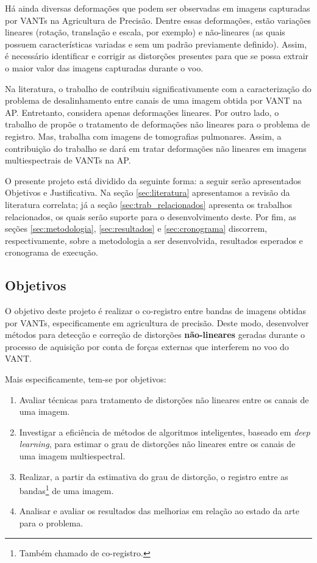 \documentclass[12pt]{article}
\begin{document}
Há ainda diversas deformações que podem ser observadas em imagens capturadas por VANTs na Agricultura de Precisão. Dentre essas deformações, estão variações lineares (rotação, translação e escala, por exemplo) e não-lineares (as quais possuem características variadas e sem um padrão previamente definido). Assim, é necessário identificar e corrigir as distorções presentes para que se possa extrair o maior valor das imagens capturadas durante o voo.

Na literatura, o trabalho de \cite{dias2020uav} contribuiu significativamente com a caracterização do problema de desalinhamento entre canais de uma imagem obtida por VANT na AP. Entretanto, \cite{dias2020uav} considera apenas deformações lineares. Por outro lado, o trabalho de \cite{eppenhof2019progressively} propõe o tratamento de deformações não lineares para o problema de registro. Mas, \cite{eppenhof2019progressively} trabalha com imagens de tomografias pulmonares. Assim, a contribuição do trabalho se dará em tratar deformações não lineares em imagens multiespectrais de VANTs na AP.

O presente projeto está dividido da seguinte forma: a seguir serão apresentados Objetivos e Justificativa. Na seção \ref{sec:literatura} apresentamos a revisão da literatura correlata; já a seção \ref{sec:trab_relacionados} apresenta os trabalhos relacionados, os quais serão suporte para o desenvolvimento deste. Por fim, as seções \ref{sec:metodologia}, \ref{sec:resultados} e \ref{sec:cronograma} discorrem, respectivamente, sobre a metodologia a ser desenvolvida, resultados esperados e cronograma de execução.

\subsection{Objetivos}

\label{sec:objetivos}

O objetivo deste projeto é realizar o co-registro entre bandas de imagens obtidas por VANTs, especificamente em agricultura de precisão. Deste modo, desenvolver métodos para detecção e correção de distorções \textbf{não-lineares} geradas durante o processo de aquisição por conta de forças externas que interferem no voo do VANT. 

Mais especificamente, tem-se por objetivos:
\begin{enumerate}
    \item Avaliar técnicas para tratamento de distorções não lineares entre os canais de uma imagem.
    \item Investigar a eficiência de métodos de algoritmos inteligentes, baseado em \textit{deep learning}, para estimar o grau de distorções não lineares entre os canais de uma imagem multiespectral.
    \item Realizar, a partir da estimativa do grau de distorção, o registro entre as bandas\footnote{Também chamado de co-registro.} de uma imagem.
    \item Analisar e avaliar os resultados das melhorias em relação ao estado da arte para o problema.
\end{enumerate}
\end{document}
